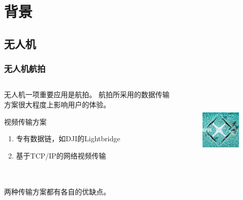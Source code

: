 \section{背景}
\subsection{无人机}
\begin{frame}[t]
	\frametitle{无人机航拍}
	\begin{columns}[t,onlytextwidth]
		\begin{column}{0.6\textwidth}
		无人机一项重要应用是航拍。
		航拍所采用的数据传输方案很大程度上影响用户的体验。
		\vspace{1em}
		\begin{block}{视频传输方案}
			\footnotesize
			\begin{enumerate}[(1)]
				\item 专有数据链，如DJI的Lightbridge
				\item 基于TCP/IP的网络视频传输
			\end{enumerate}
		\end{block}
		\end{column}
		\hspace{0.5em}
		\begin{column}{0.4\textwidth}
			\vspace{-3em}
			\begin{figure}
				\includegraphics[height=4.2cm]{figures/uavhangpai.eps}
			\end{figure}
		\end{column}	
	\end{columns}
	\vspace{1.5em}
	两种传输方案都有各自的优缺点。
\end{frame}

